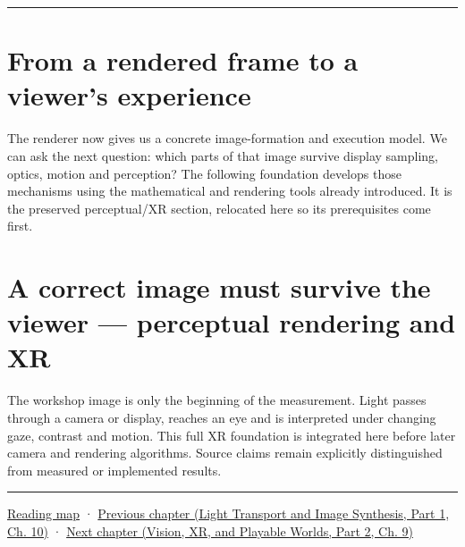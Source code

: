 \begin{center}\rule{0.5\linewidth}{0.5pt}\end{center}

\section{From a rendered frame to a viewer's experience}\label{04-visual-computing-ii-ch041-from-a-rendered-frame-to-a-viewers-experience}

\hypertarget{04-visual-computing-ii-ch041-from-a-rendered-frame-to-a-viewers-experience}{}

The renderer now gives us a concrete image-formation and execution model. We can ask the next question: which parts of that image survive display sampling, optics, motion and perception? The following foundation develops those mechanisms using the mathematical and rendering tools already introduced. It is the preserved perceptual/XR section, relocated here so its prerequisites come first.

\section{A correct image must survive the viewer --- perceptual rendering and XR}\label{04-visual-computing-ii-ch041-a-correct-image-must-survive-the-viewer-perceptual-rendering-and-xr}

\hypertarget{04-visual-computing-ii-ch041-a-correct-image-must-survive-the-viewer-perceptual-rendering-and-xr}{}

The workshop image is only the beginning of the measurement. Light passes through a camera or display, reaches an eye and is interpreted under changing gaze, contrast and motion. This full XR foundation is integrated here before later camera and rendering algorithms. Source claims remain explicitly distinguished from measured or implemented results.

\begin{center}\rule{0.5\linewidth}{0.5pt}\end{center}

\hyperref[volume-reading-map]{Reading map} · \href{../04-Light-Transport-and-Image-Synthesis-P01/main.pdf\#04-visual-computing-ii-ch040-lighting-reconstruction-and-surface-motion}{Previous chapter (Light Transport and Image Synthesis, Part 1, Ch. 10)} · \href{../07-Vision-XR-and-Playable-Worlds-P02/main.pdf\#04-visual-computing-ii-ch042-xr-radiometry-optics-and-perception}{Next chapter (Vision, XR, and Playable Worlds, Part 2, Ch. 9)}
